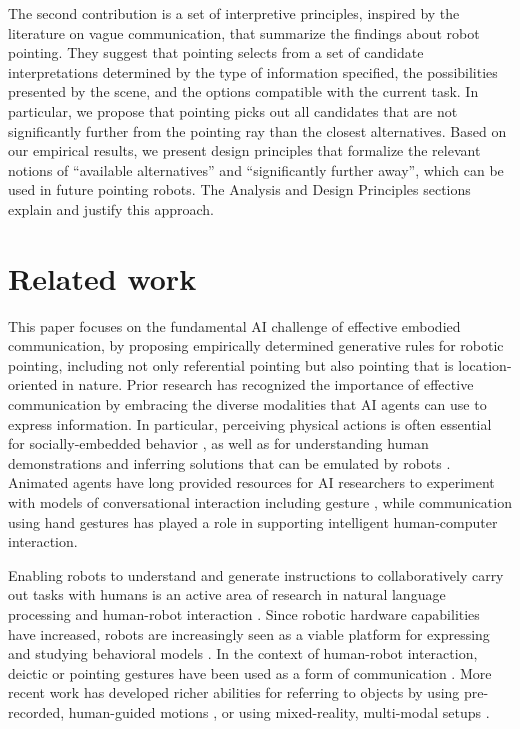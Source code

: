\documentclass[letterpaper]{article} %
\begin{document}
The second contribution is a set of interpretive principles, inspired by the literature on vague communication, that summarize the findings about robot pointing.  They suggest that pointing selects from a set of candidate interpretations determined by the type of information specified, the possibilities presented by the scene, and the options compatible with the current task.  In particular, we propose that pointing picks out all candidates that are not significantly further from the pointing ray than the closest alternatives.  Based on our empirical results, we present design principles that formalize the relevant notions of ``available alternatives'' and ``significantly further away'', which can be used in future pointing robots.  The Analysis and Design Principles sections explain and justify this approach.


\section{Related work}
\label{related-work}

This paper focuses on the fundamental AI challenge of effective embodied communication, by proposing empirically determined generative rules for robotic pointing, including not only referential pointing but also pointing that is location-oriented in nature. Prior research has recognized the importance of effective communication by embracing the diverse modalities that AI agents can use to express information. In particular, perceiving physical actions \cite{thibadeau1986artificial} is often essential for socially-embedded behavior \cite{dautenhahn2002embodied}, as well as for understanding human demonstrations and inferring solutions that can be emulated by robots \cite{kuniyoshi1994learning}. Animated agents have long provided resources for AI researchers to experiment with models of conversational interaction including gesture \cite{cassell:siggraph1994}, while communication using hand gestures \cite{pavlovic1997visual} has played a role in supporting intelligent human-computer interaction. 

Enabling robots to understand and generate instructions to collaboratively carry out tasks with humans is an active area of research in natural language processing and human-robot interaction \cite{butepage2017human,cha2018survey}. Since robotic hardware capabilities have increased, robots are increasingly seen as a viable platform for expressing and studying behavioral models \cite{scassellati2000investigating}.  In the context of human-robot interaction, deictic or pointing gestures have been used as a form of communication \cite{pook1996deictic}.  More recent work has developed richer abilities for referring to objects by using pre-recorded, human-guided motions \cite{sauppe2014robot}, or using mixed-reality, multi-modal setups \cite{williams2019mixed}. 
\end{document}
